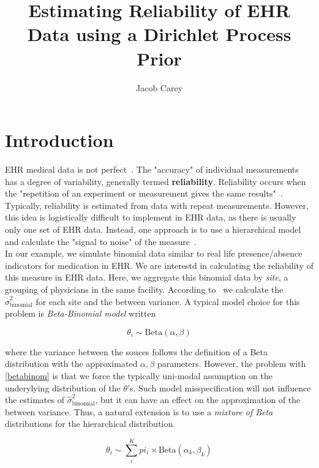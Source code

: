 \documentclass{article}
\begin{document}
\title{Estimating Reliability of EHR Data using a Dirichlet Process Prior}
\author{Jacob Carey}

\maketitle

\section{Introduction}

EHR medical data is not perfect~\cite{kanger2014}. The "accuracy" of individual measurements has a degree of variability, generally termed \textbf{reliability}. Reliability occurs when the "repetition of an experiment or measurement gives the same results"~\cite{porta2008}.  Typically, reliability is estimated from data with repeat measurements. However, this idea is logistically difficult to implement in EHR data, as there is usually only one set of EHR data. Instead, one approach is to use a hierarchical model and calculate the "signal to noise" of the measure~\cite{Adams2009}. \\

In our example, we simulate binomial data similar to real life presence/absence indicators for medication in EHR. We are interestd in calculating the reliability of this measure in EHR data. Here, we aggregate this binomial data by \textit{site}, a grouping of physicians in the same facility. According to~\cite{Adams2009} we calculate the $\hat{\sigma}^2_{\text{binomial}}$ for each site and the between variance. A typical model choice for this problem is \textit{Beta-Binomial model} written

\begin{equation}\label{betabinom}
\theta_i \sim \text{Beta}(\alpha, \beta)
\end{equation}

where the variance between the souces follows the definition of a Beta distribution with the approximated $\alpha, \beta$ parameters. However, the problem with \eqref{betabinom} is that we force the typically uni-modal assumption on the underylying distribution of the $\theta$'s. Such model misspecification will not influence the estimates of $\hat{\sigma}^2_{\text{binomial}}$, but it can have an effect on the approximation of the between variance. Thus, a natural extension is to use a \textit{mixture of Beta} distributions for the hierarchical distribution.

\begin{equation}\label{eq:finitemix-betabinom}
\theta_i \sim \sum_i^K pi_i \times \text{Beta}(\alpha_k, \beta_k)
\end{equation}
\end{document}
